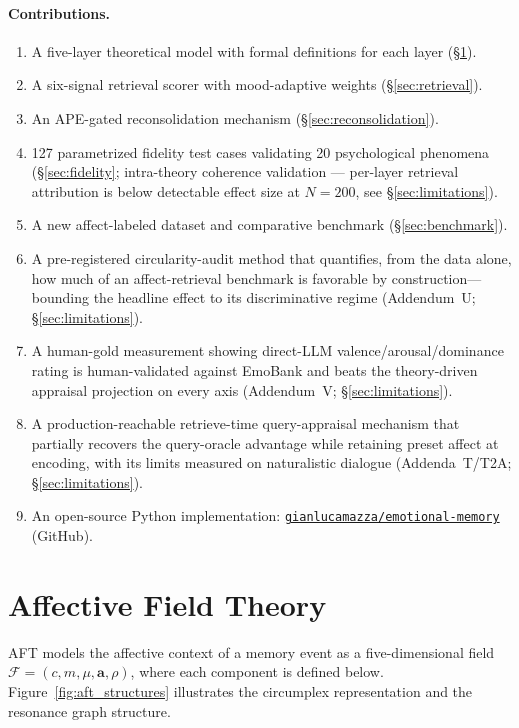 \documentclass[11pt]{article}
\newcommand{\repourl}{https://github.com/gianlucamazza/emotional-memory}%
\begin{document}
\paragraph{Contributions.}
\begin{enumerate}
  \item A five-layer theoretical model with formal definitions for each layer (\S\ref{sec:aft}).
  \item A six-signal retrieval scorer with mood-adaptive weights (\S\ref{sec:retrieval}).
  \item An APE-gated reconsolidation mechanism (\S\ref{sec:reconsolidation}).
  \item 127 parametrized fidelity test cases validating 20 psychological phenomena (\S\ref{sec:fidelity}; intra-theory coherence validation — per-layer retrieval attribution is below detectable effect size at $N=200$, see \S\ref{sec:limitations}).
  \item A new affect-labeled dataset and comparative benchmark (\S\ref{sec:benchmark}).
  \item A pre-registered circularity-audit method that quantifies, from the data alone, how much of an affect-retrieval benchmark is favorable by construction—bounding the headline effect to its discriminative regime (Addendum~U; \S\ref{sec:limitations}).
  \item A human-gold measurement showing direct-LLM valence/arousal/dominance rating is human-validated against EmoBank and beats the theory-driven appraisal projection on every axis (Addendum~V; \S\ref{sec:limitations}).
  \item A production-reachable retrieve-time query-appraisal mechanism that partially recovers the query-oracle advantage while retaining preset affect at encoding, with its limits measured on naturalistic dialogue (Addenda~T/T2A; \S\ref{sec:limitations}).
  \item An open-source Python implementation: \href{\repourl}{\texttt{gianlucamazza/emotional-memory}} (GitHub).
\end{enumerate}

\section{Affective Field Theory}
\label{sec:aft}

AFT models the affective context of a memory event as a five-dimensional field
$\mathcal{F} = (c, m, \mu, \mathbf{a}, \rho)$, where each component is defined below.
Figure~\ref{fig:aft_structures} illustrates the circumplex representation and the
resonance graph structure.
\end{document}
